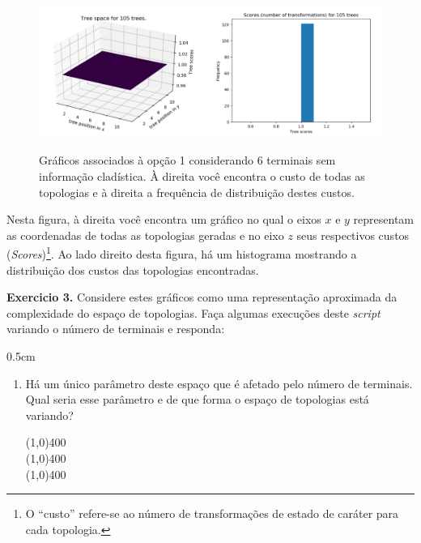 \begin{refsection}
  \begin{figure}[H]
  \centering
       \centering
      {\includegraphics[scale=0.65]{figures/tut3/opcao_1_6_terminals.pdf}}
      {\caption[\textit{\textit{No informative characters} }]{Gráficos associados à opção 1 considerando 6 terminais sem informação cladística. À direita você encontra o custo de todas as topologias e à direita a frequência de distribuição destes custos.}\label{tut3:fig:flat}}
  \end{figure}



Nesta figura, à direita você encontra um gráfico no qual o eixos $x$ e $y$ representam as coordenadas de todas as topologias geradas e no eixo $z$ seus respectivos custos  (\textit{Scores})\footnote{O ``custo'' refere-se ao número de transformações de estado de caráter para cada topologia.}. Ao lado direito desta figura, há um histograma mostrando a distribuição dos custos das topologias encontradas.\\

\begin{blackBlock}{\textbf{Exercicio 3.}}\label{tut3:ex:3.\arabic{ex}}
	Considere estes gráficos como uma representação aproximada da complexidade do espaço de topologias. Faça algumas execuções deste \textit{script} variando o número de terminais e responda:
\begin {myindentpar}{0.5cm}
\begin{enumerate}[\itshape i.]
 \item{Há um único parâmetro deste espaço que é afetado pelo número de terminais. Qual seria esse parâmetro e de que forma o espaço de topologias está variando?}\label{tut3:ex1}\\
  \begin{center}
  \line(1,0){400}\\
  \line(1,0){400}\\
  \line(1,0){400}\\
  \end{center}


\end{enumerate}
\end{myindentpar}
\end{blackBlock}
\end{refsection}
